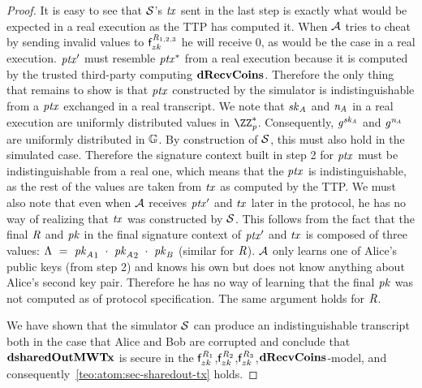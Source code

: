 \begin{proof}
    It is easy to see that $\mathcal{S}$'s $\mathit{tx}$ sent in the last step is exactly what would be expected in a real execution as the TTP has computed it.
    When $\mathcal{A}$ tries to cheat by sending invalid values to $\mathsf{f}^{\mathit{R}_{1,2,3}}_{zk}$ he will receive 0, as would be the case in a real execution.
    ${\mathit{ptx}}'$ must resemble $\mathit{ptx}^*$ from a real execution because it is computed by the trusted third-party computing $\mathbf{dRecvCoins}$.
    Therefore the only thing that remains to show is that $\mathit{ptx}$ constructed by the simulator is indistinguishable from a $\mathit{ptx}$ exchanged in a real transcript.
    We note that $\mathit{sk}_{\mathit{A}}$ and $\mathit{\mathit{n}_{\mathit{A}}}$ in a real execution are uniformly distributed values in $\cnstIntegersPrimeWithoutZero{\varPrime}$.
    Consequently, $\mathit{g}^{\mathit{sk}_{\mathit{A}}}$ and $\mathit{g}^{\mathit{\mathit{n}_{\mathit{A}}}}$ are uniformly distributed in $\mathbb{G}$.
    By construction of $\mathcal{S}$, this must also hold in the simulated case.
    Therefore the signature context built in step 2 for $\mathit{ptx}$ must be indistinguishable from a real one, which means that the $\mathit{ptx}$ is indistinguishable, as the rest of the values are taken from $\mathit{tx}$ as computed by the TTP.
    We must also note that even when $\mathcal{A}$ receives ${\mathit{ptx}}'$ and $\mathit{tx}$ later in the protocol, he has no way of realizing that $\mathit{tx}$ was constructed by $\mathcal{S}$.
    This follows from the fact that the final $\mathit{R}$ and $\mathit{pk}$ in the final signature context of ${\mathit{ptx}}'$ and $\mathit{tx}$ is composed of three values:
    $\Lambda ~=~ {\mathit{pk}_{\mathit{A}}}_1 ~\cdot~ {\mathit{pk}_{\mathit{A}}}_2 ~\cdot~ {\mathit{pk}_{\mathit{B}}}$ (similar for $\mathit{R}$).
    $\mathcal{A}$ only learns one of Alice's public keys (from step 2) and knows his own but does not know anything about Alice's second key pair.
    Therefore he has no way of learning that the final $\mathit{pk}$ was not computed as of protocol specification.
    The same argument holds for $\mathit{R}$.

    We have shown that the simulator $\mathcal{S}$ can produce an indistinguishable transcript both in the case that Alice and Bob are corrupted and conclude that $\mathbf{dsharedOutMWTx}$ is secure in the $\mathsf{f}^{\mathit{R}_1}_{zk}$,$\mathsf{f}^{\mathit{R}_2}_{zk}$,$\mathsf{f}^{\mathit{R}_3}_{zk}$,$\mathbf{dRecvCoins}$-model, and consequently~\cref{teo:atom:sec-sharedout-tx} holds.
\end{proof}

